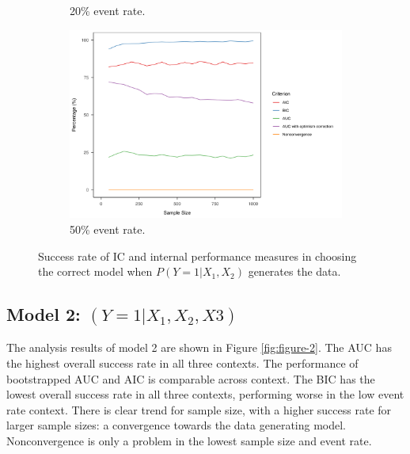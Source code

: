 \documentclass[AMA,STIX1COL]{WileyNJD-v5}
\begin{document}
\begin{figure}[h]
\begin{subfigure}{0.29\textwidth}
    \caption{20\% event rate.}
    \label{fig:sub-2-figure-1}
\end{subfigure}
\hspace{-0.1cm}
\begin{subfigure}{0.408\textwidth}
    \includegraphics[width=\textwidth]{"experiment_2/plot.50.png"}
    \caption{50\% event rate.}
    \label{fig:sub-3-figure-1}
\end{subfigure}
        
\caption{Success rate of IC and internal performance measures in choosing the correct model when $P(Y=1|X_1,X_2)$ generates the data.}
\label{fig:figure-1}
\end{figure}

\hypertarget{model-2-y1x_1-x_2-x3}{%
\subsection{\texorpdfstring{Model 2:
\((Y=1|X_1, X_2, X3)\)}{Model 2: (Y=1\textbar X\_1, X\_2, X3)}}\label{model-2-y1x_1-x_2-x3}}

The analysis results of model 2 are shown in Figure \ref{fig:figure-2}.
The AUC has the highest overall success rate in all three contexts. The
performance of bootstrapped AUC and AIC is comparable across context.
The BIC has the lowest overall success rate in all three contexts,
performing worse in the low event rate context. There is clear trend for
sample size, with a higher success rate for larger sample sizes: a
convergence towards the data generating model. Nonconvergence is only a
problem in the lowest sample size and event rate.
\end{document}
